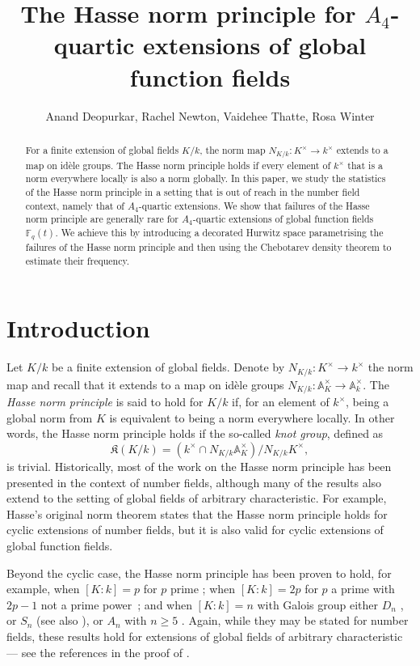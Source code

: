 \documentclass{amsart}
\title{The Hasse norm principle for $A_4$-quartic extensions of global function fields}
\author{Anand Deopurkar, Rachel Newton, Vaidehee Thatte, Rosa Winter}
\date{}
\numberwithin{equation}{section} \numberwithin{figure}{section}
\theoremstyle{one}
\theoremstyle{definition}
\begin{document}
\begin{abstract}
For a finite extension of global fields $K/k$, the norm map $N_{K/k}: K^{\times} \rightarrow k^{\times}$ extends to a map on idèle groups. The Hasse norm principle holds if every element of $k^\times$ that is a norm everywhere locally is also a norm globally. 
In this paper, we study the statistics of the Hasse norm principle in a setting that is out of reach in the number field context, namely that of $A_4$-quartic extensions. 
We show that failures of the Hasse norm principle are generally rare for \(A_4\)-quartic extensions of global function fields \(\mathbb{F}_q(t)\).
We achieve this by introducing a decorated Hurwitz space parametrising the failures of the Hasse norm principle and then using the Chebotarev density theorem to estimate their frequency.
\end{abstract}

\maketitle

\section{Introduction}\label{sec: Introduction}



Let $K/k$ be a finite extension of global fields.
Denote by \(N_{K/k} \colon K^{\times} \rightarrow k^{\times}\) the norm map and recall that it extends to a map on id\`{e}le groups \(N_{K/k} \colon \mathbb{A}_K^{\times} \to \mathbb{A}_k^{\times}\).
The \emph{Hasse norm principle} is said to hold for $K/k$ if, for an element of $k^\times$, being a global norm from $K$ is equivalent to being a norm everywhere locally. In other words, the Hasse norm principle holds if the so-called \emph{knot group}, defined as $$\mathfrak{K}(K/k)=(k^\times\cap N_{K/k}\mathbb{A}_K^\times)/N_{K/k}K^\times,$$ is trivial. Historically, most of the work on the Hasse norm principle has been presented in the context of number fields, although many of the results also extend to the setting of global fields of arbitrary characteristic. For example, Hasse's original norm theorem states that the Hasse norm principle holds for cyclic extensions of number fields, but it is also valid for cyclic extensions of global function fields. 

Beyond the cyclic case, the Hasse norm principle has been proven to hold, for example, when $[K:k]=p$ for $p$ prime \cite{bar:81}; when $[K:k]=2p$ for $p$ a prime with $2p-1$ not a prime power~\cite{ost:}; and when $[K:k]=n$ with Galois group either $D_n$ \cite{bar:81*1}, or $S_n$ \cite{kun.vos:84} (see also \cite{vos:88}), or $A_n$ with $n\geq5$ \cite{mac:20}. Again, while they may be stated for number fields, these results hold for extensions of global fields of arbitrary characteristic --- see the references in the proof of .
\end{document}
